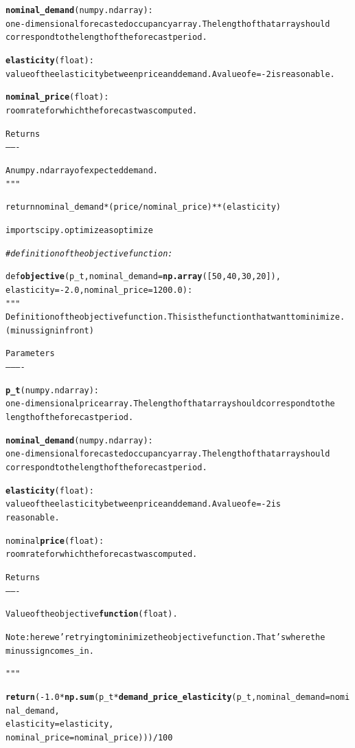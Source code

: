 \documentclass{article}\usepackage[]{graphicx}\usepackage[]{color}
\makeatletter
\newcommand{\hlstr}[1]{\textcolor[rgb]{0.192,0.494,0.8}{#1}}%
\newcommand{\hlcom}[1]{\textcolor[rgb]{0.678,0.584,0.686}{\textit{#1}}}%
\newcommand{\hlkwd}[1]{\textcolor[rgb]{0.737,0.353,0.396}{\textbf{#1}}}%
\newenvironment{kframe}{%
 \def\at@end@of@kframe{}%
 \ifinner\ifhmode%
  \def\at@end@of@kframe{\end{minipage}}%
  \begin{minipage}{\columnwidth}%
 \fi\fi%
 \def\FrameCommand##1{\hskip\@totalleftmargin \hskip-\fboxsep
 \colorbox{shadecolor}{##1}\hskip-\fboxsep
     \hskip-\linewidth \hskip-\@totalleftmargin \hskip\columnwidth}%
 \MakeFramed {\advance\hsize-\width
   \@totalleftmargin\z@ \linewidth\hsize
   \@setminipage}}%
 {\par\unskip\endMakeFramed%
 \at@end@of@kframe}
\newenvironment{knitrout}{}{} %
\makeatother
\begin{document}
\begin{knitrout}
\begin{kframe}
\begin{alltt}
    \hlkwd{nominal_demand} (numpy.ndarray):
        one-dimensional forecasted occupancy array. The length of that array should
        correspond to the length of the forecast period.

    \hlkwd{elasticity} (float):
        value of the elasticity between price and demand. A value of e=-2 is reasonable.

    \hlkwd{nominal_price} (float):
        room rate for which the forecast was computed.

    Returns
    -------

    A numpy.ndarray of expected demand.
    \hlstr{""}"

    return nominal_demand * ( price / nominal_price ) ** (elasticity)

import scipy.optimize as optimize

\hlcom{# definition of the objective function:}

def \hlkwd{objective}(p_t, nominal_demand=\hlkwd{np.array}([50,40,30,20]),
              elasticity=-2.0, nominal_price=1200.0):
    \hlstr{""}"
    Definition of the objective function. This is the function that want to minimize.
    (minus sign in front)

    Parameters
    ----------

    \hlkwd{p_t} (numpy.ndarray):
        one-dimensional price array. The length of that array should correspond to the
        length of the forecast period.

    \hlkwd{nominal_demand} (numpy.ndarray):
        one-dimensional forecasted occupancy array. The length of that array should
        correspond to the length of the forecast period.

    \hlkwd{elasticity} (float):
        value of the elasticity between price and demand. A value of e=-2 is
        reasonable.

    nominal \hlkwd{price} (float):
        room rate for which the forecast was computed.

    Returns
    -------

    Value of the objective \hlkwd{function} (float).

    Note: here we\hlstr{'re trying to minimize the objective function. That'}s where the
    minus sign comes_in.

    \hlstr{""}"

    \hlkwd{return} (-1.0 * \hlkwd{np.sum}( p_t * \hlkwd{demand_price_elasticity}(p_t, nominal_demand=nominal_demand,
                                                        elasticity=elasticity,
                                                        nominal_price=nominal_price) )) / 100


\end{alltt}
\end{kframe}
\end{knitrout}
\end{document}
